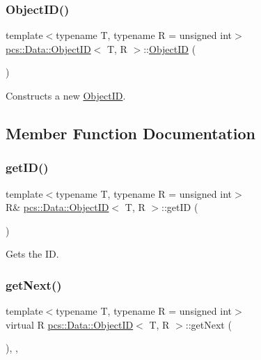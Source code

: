 \subsubsection{\texorpdfstring{Object\+I\+D()}{ObjectID()}}
{\footnotesize\ttfamily template$<$typename T, typename R = unsigned int$>$ \\
\hyperlink{classpcs_1_1Data_1_1ObjectID}{pcs\+::\+Data\+::\+Object\+ID}$<$ T, R $>$\+::\hyperlink{classpcs_1_1Data_1_1ObjectID}{Object\+ID} (\begin{DoxyParamCaption}{ }\end{DoxyParamCaption})\hspace{0.3cm}{\ttfamily [inline]}}



Constructs a new \hyperlink{classpcs_1_1Data_1_1ObjectID}{Object\+ID}. 



\subsection{Member Function Documentation}
\mbox{\label{classpcs_1_1Data_1_1ObjectID_aaee6ebc98b85f079ff8597f5c6f39cb3}} 
\subsubsection{\texorpdfstring{get\+I\+D()}{getID()}}
{\footnotesize\ttfamily template$<$typename T, typename R = unsigned int$>$ \\
R\& \hyperlink{classpcs_1_1Data_1_1ObjectID}{pcs\+::\+Data\+::\+Object\+ID}$<$ T, R $>$\+::get\+ID (\begin{DoxyParamCaption}{ }\end{DoxyParamCaption})\hspace{0.3cm}{\ttfamily [inline]}}



Gets the ID. 

\mbox{\label{classpcs_1_1Data_1_1ObjectID_a01456dc5ee820984c83c089e413255ec}} 
\subsubsection{\texorpdfstring{get\+Next()}{getNext()}}
{\footnotesize\ttfamily template$<$typename T, typename R = unsigned int$>$ \\
virtual R \hyperlink{classpcs_1_1Data_1_1ObjectID}{pcs\+::\+Data\+::\+Object\+ID}$<$ T, R $>$\+::get\+Next (\begin{DoxyParamCaption}{ }\end{DoxyParamCaption})\hspace{0.3cm}{\ttfamily [inline]}, {\ttfamily [protected]}, {\ttfamily [virtual]}}



